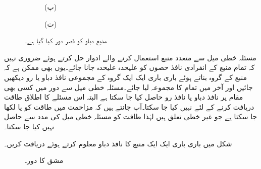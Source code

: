 \begin{figure}
\begin{subfigure}{0.5\textwidth}
\caption*{(پ)}
\end{subfigure}%
\begin{subfigure}{0.5\textwidth}
\centering
{}
\caption*{(ت)}
\end{subfigure}%
\caption{منبع دباو کو قصر دور کیا گیا ہے۔}
\label{شکل_مسئلہ_منبع_دباو_قصر_دور_کیا_گیا_ہے}
\end{figure}

مسئلہ خطی میل سے متعدد منبع استعمال کرنے والے ادوار حل کرتے ہوئے ضروری نہیں کہ تمام منبع کے انفرادی نافذ حصوں کو علیحدہ علیحدہ جانا جائے۔یوں بھی ممکن ہے کہ منبع کے گروہ بناتے ہوئے باری باری ایک ایک گروہ کے مجموعی نافذ دباو یا رو دیکھیں جائیں اور آخر میں تمام کا مجموعہ لیا جائے۔مسئلہ خطی میل سے دور میں کسی بھی مقام پر نافذ  دباو یا نافذ رو حاصل کیا جا سکتا ہے البتہ اس مسئلے کا اطلاق طاقت دریافت کرنے کے لئے نہیں کیا جا سکتا۔آپ جانتے ہیں کہ مزاحمت میں طاقت کو  یا  لکھا جا سکتا ہے جو غیر خطی تعلق ہیں لہٰذا طاقت کو مسئلہ خطی میل کی مدد سے حاصل نہیں کیا جا سکتا۔

شکل  میں باری باری ایک ایک منبع کا نافذ دباو معلوم کرتے ہوئے  دریافت کریں۔

\begin{figure}
\centering
{}
\caption{مشق  کا دور۔}
\label{شکل_مسئلہ_باری_باری_الف}
\end{figure}

